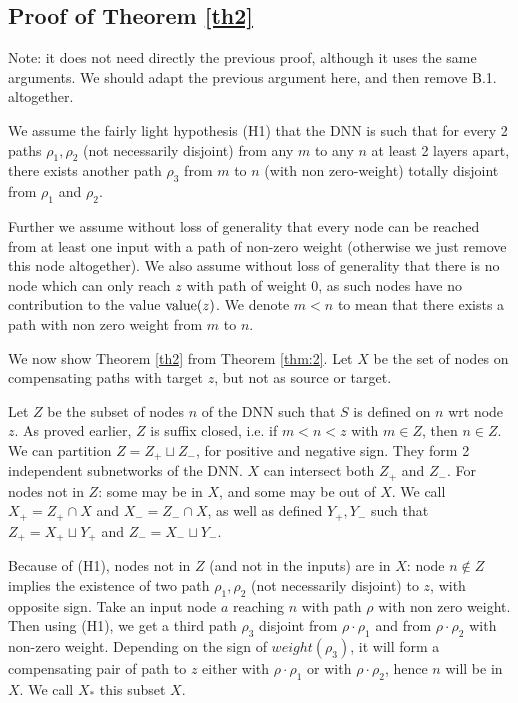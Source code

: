 \subsection{Proof of Theorem \ref{th2}}
			
Note: it does not need directly the previous proof, although it uses the same arguments.
We should adapt the previous argument here, and then remove B.1. altogether.

We assume the fairly light hypothesis (H1) that the DNN is such that for every 2 paths $\rho_1,\rho_2$ (not necessarily disjoint) from any $m$ to any $n$ at least 2 layers apart, there exists another path $\rho_3$ from $m$ to $n$ (with non zero-weight) totally disjoint from $\rho_1$ and $\rho_2$. 

Further we assume without loss of generality that every node can be reached from at least one input with a path of non-zero weight (otherwise we just remove this node altogether).
We also assume without loss of generality that there is no node which can only reach $z$ with path of weight $0$, as such nodes have no contribution to the value ${\textrm{value}}(z)$. We denote $m<n$ to mean that there exists a path with non zero weight from $m$ to $n$.

			\smallskip


			We now show Theorem \ref{th2} from Theorem \ref{thm:2}.
			Let $X$ be the set of nodes on compensating paths with target $z$, but not as source or target.
		
			Let $Z$ be the subset of nodes $n$ of the DNN such that $S$ is defined on $n$ 
			wrt node $z$. As proved earlier, $Z$ is suffix closed, i.e. if $m<n<z$ with $m \in Z$, then $n \in Z$. We can partition $Z = Z_{+} \sqcup Z_{-}$, for positive and negative sign. They form 2 independent subnetworks of the DNN.
			$X$ can intersect both $Z_+$ and $Z_-$.
			For nodes not in $Z$: some may be in $X$, and some may be out of $X$.
			We call $X_+ = Z_+ \cap X$ and $X_-=Z_- \cap X$, as well as 
			defined $Y_+,Y_-$ such that $Z_+ = X_+ \sqcup Y_+$ and $Z_- = X_- \sqcup Y_-$.
			
			Because of (H1), nodes not in $Z$ (and not in the inputs) are in $X$:
			node $n \notin Z$ implies the existence of two path $\rho_1,\rho_2$ (not necessarily disjoint) to $z$, with opposite sign. 
			Take an input node $a$ reaching $n$ with path $\rho$ with non zero weight.
			Then using (H1), we get a third path $\rho_3$ disjoint from $\rho \cdot \rho_1$ and from $\rho \cdot \rho_2$ with non-zero weight. Depending on the sign of $weight(\rho_3)$, it will form a compensating pair of path to $z$ either with $\rho \cdot \rho_1$ or with $\rho \cdot \rho_2$, hence $n$ will be in $X$. We call $X_*$ this subset $X$.
			

